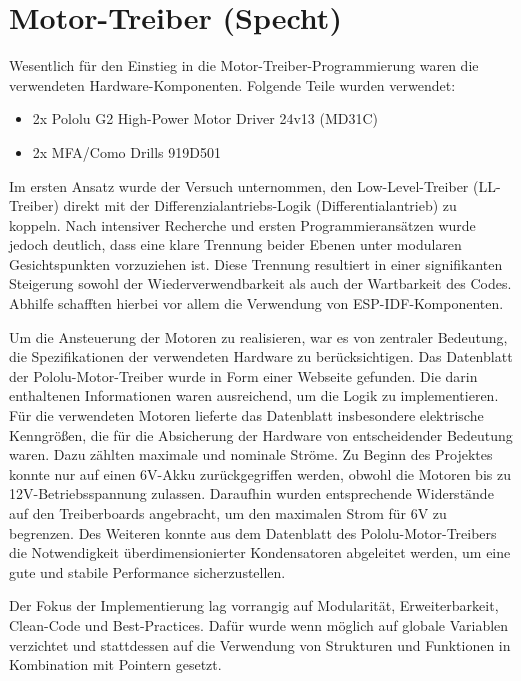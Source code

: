 \section{Motor-Treiber (Specht)}

Wesentlich für den Einstieg in die Motor-Treiber-Programmierung waren die verwendeten Hardware-Komponenten. Folgende Teile wurden verwendet:

\begin{itemize}
    \item 2x Pololu G2 High-Power Motor Driver 24v13 (MD31C)
    \item 2x MFA/Como Drills 919D501
\end{itemize}

Im ersten Ansatz wurde der Versuch unternommen, den Low-Level-Treiber (LL-Treiber) direkt mit der Differenzialantriebs-Logik (Differentialantrieb) zu koppeln. Nach intensiver Recherche und ersten Programmieransätzen wurde jedoch deutlich, dass eine klare Trennung beider Ebenen unter modularen Gesichtspunkten vorzuziehen ist. Diese Trennung resultiert in einer signifikanten Steigerung sowohl der Wiederverwendbarkeit als auch der Wartbarkeit des Codes. Abhilfe schafften hierbei vor allem die Verwendung von ESP-IDF-Komponenten.\newline

Um die Ansteuerung der Motoren zu realisieren, war es von zentraler Bedeutung, die Spezifikationen der verwendeten Hardware zu berücksichtigen. Das Datenblatt der Pololu-Motor-Treiber wurde in Form einer Webseite gefunden. Die darin enthaltenen Informationen waren ausreichend, um die Logik zu implementieren. Für die verwendeten Motoren lieferte das Datenblatt insbesondere elektrische Kenngrößen, die für die Absicherung der Hardware von entscheidender Bedeutung waren. Dazu zählten maximale und nominale Ströme. Zu Beginn des Projektes konnte nur auf einen 6V-Akku zurückgegriffen werden, obwohl die Motoren bis zu 12V-Betriebsspannung zulassen. Daraufhin wurden entsprechende Widerstände auf den Treiberboards angebracht, um den maximalen Strom für 6V zu begrenzen. Des Weiteren konnte aus dem Datenblatt des Pololu-Motor-Treibers die Notwendigkeit überdimensionierter Kondensatoren abgeleitet werden, um eine gute und stabile Performance sicherzustellen. \newline

Der Fokus der Implementierung lag vorrangig auf Modularität, Erweiterbarkeit, Clean-Code und Best-Practices. Dafür wurde wenn möglich auf globale Variablen verzichtet und stattdessen auf die Verwendung von Strukturen und Funktionen in Kombination mit Pointern gesetzt.

